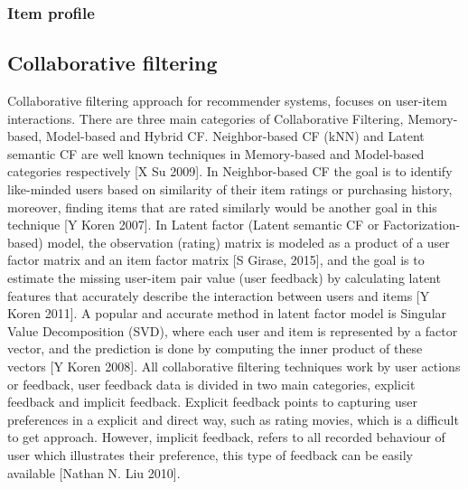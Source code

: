 \subsubsection{Item profile}




\subsection{Collaborative filtering}
Collaborative filtering approach for recommender systems, focuses on user-item interactions. There are three main categories of Collaborative Filtering, Memory-based, Model-based and Hybrid CF. Neighbor-based CF (kNN) and Latent semantic CF are well known techniques in Memory-based and Model-based categories respectively  [X Su 2009]. In Neighbor-based CF the goal is to identify like-minded users based on similarity of their item ratings or purchasing history, moreover, finding items that are rated similarly would be another goal in this technique [Y Koren 2007]. In Latent factor (Latent semantic CF or Factorization-based) model, the observation (rating) matrix is modeled as a product of a user factor matrix and an item factor matrix [S Girase, 2015], and the goal is to estimate the missing user-item pair value (user feedback) by calculating latent features that accurately describe the interaction between users and items [Y Koren 2011]. A popular and accurate method in latent factor model is Singular Value Decomposition (SVD), where each user and item is represented by a factor vector, and the prediction is done by computing the inner product of these vectors  [Y Koren 2008]. 
All collaborative filtering techniques work by user actions or feedback, user feedback data is divided in two main categories, explicit feedback and implicit feedback. Explicit feedback points to capturing user preferences in a explicit and direct way, such as rating movies, which is a difficult to get approach. However, implicit feedback, refers to all recorded behaviour of user which illustrates their preference, this type of feedback can be easily available  [Nathan N. Liu 2010]. 



